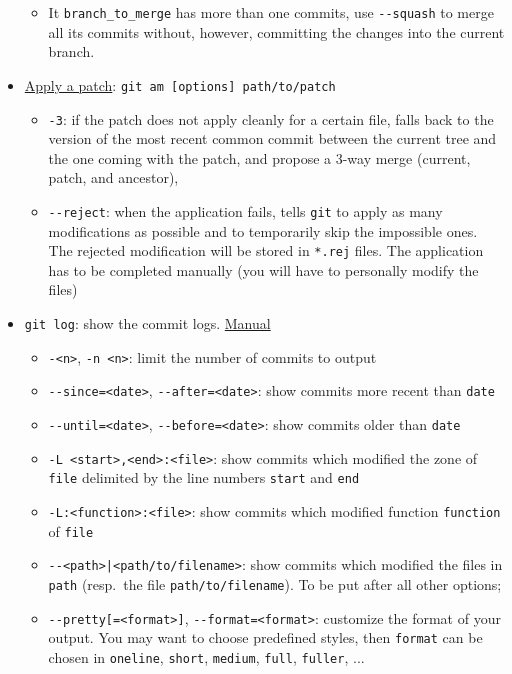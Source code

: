 \documentclass[a4paper,12pt,%
              final%
              ]{article}
\begin{document}
\begin{itemize}
\begin{itemize}
      \item It \verb|branch_to_merge| has more than one commits, use \verb|--squash| to merge all its commits without, however, committing the changes into the current branch.
    \end{itemize}
  \item \href{https://git-scm.com/docs/git-am}{Apply a patch}: \verb|git am [options] path/to/patch|
    \begin{itemize}
      \item \texttt{-3}: if the patch does not apply cleanly for a certain file, falls back to the version of the most recent common commit between the current tree and the one coming with the patch, and propose a 3-way merge (current, patch, and ancestor),
      \item \verb|--reject|: when the application fails, tells \texttt{git} to apply as many modifications as possible and to temporarily skip the impossible ones. The rejected modification will be stored in \texttt{*.rej} files. The application has to be completed manually (you will have to personally modify the files)
    \end{itemize}
  \item \texttt{git log}: show the commit logs. \href{https://git-scm.com/docs/git-log}{Manual}
    \begin{itemize}
      \item \texttt{-<n>}, \texttt{-n <n>}: limit the number of commits to output
      \item \verb|--since=<date>|, \verb|--after=<date>|: show commits more recent than \texttt{date}
      \item \verb|--until=<date>|, \verb|--before=<date>|: show commits older than \texttt{date}
      \item \verb|-L <start>,<end>:<file>|: show commits which modified the zone of \texttt{file} delimited by the line numbers \texttt{start} and \texttt{end}
      \item \verb|-L:<function>:<file>|: show commits which modified function \texttt{function} of \texttt{file}
      \item \verb!--<path>|<path/to/filename>!: show commits which modified the files in \texttt{path} (resp.~the file \verb|path/to/filename|). To be put after all other options;
      \item \verb|--pretty[=<format>]|, \verb|--format=<format>|: customize the format of your output. You may want to choose predefined styles, then \texttt{format} can be chosen in \texttt{oneline}, \texttt{short}, \texttt{medium}, \texttt{full}, \texttt{fuller}, ...

\end{itemize}
\end{itemize}
\end{document}
